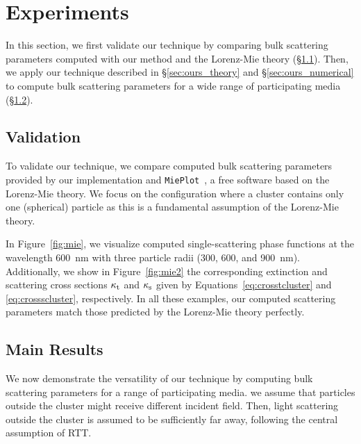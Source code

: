 \section{Experiments}
\label{sec:result}
%
In this section, we first validate our technique by comparing bulk scattering parameters computed with our method and the Lorenz-Mie theory (\S\ref{ssec:result_validation}).
Then, we apply our technique described in \S\ref{sec:ours_theory} and \S\ref{sec:ours_numerical} to compute bulk scattering parameters for a wide range of participating media (\S\ref{ssec:result_main}).



\subsection{Validation}
\label{ssec:result_validation}
%
To validate our technique, we compare computed bulk scattering parameters provided by our implementation and \texttt{MiePlot}~\cite{laven2011mieplot}, a free software based on the Lorenz-Mie theory.
We focus on the configuration where a cluster contains only one (spherical) particle as this is a fundamental assumption of the Lorenz-Mie theory.

In Figure~\ref{fig:mie}, we visualize computed single-scattering phase functions at the wavelength 600~nm with three particle radii (300, 600, and 900~nm).
 Additionally, we show in Figure~\ref{fig:mie2} the corresponding extinction and scattering cross sections $\kappa_\mathrm{t}$ and $\kappa_\mathrm{s}$ given by Equations~\eqref{eq:crosstcluster} and \eqref{eq:crossscluster}, respectively.
In all these examples, our computed scattering parameters match those predicted by the Lorenz-Mie theory perfectly.

\subsection{Main Results}
\label{ssec:result_main}
%
We now demonstrate the versatility of our technique by computing bulk scattering parameters for a range of participating media. 
we assume that particles outside the cluster might receive different incident field. Then, light scattering outside the cluster is assumed to be sufficiently far away, following the central assumption of RTT.

